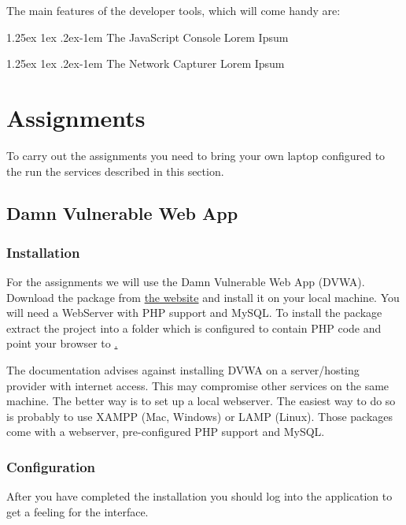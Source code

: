 \documentclass{report}
\makeatletter
\renewcommand{\paragraph}{
  \@startsection{paragraph}{4}
    {\z@}{1.25ex \@plus 1ex \@minus .2ex}{-1em}
      {\normalfont\normalsize\bfseries}
      }
\makeatother
\begin{document}
The main features of the developer tools, which will come handy are: 

\paragraph{The JavaScript Console}
Lorem Ipsum

\paragraph{The Network Capturer}
Lorem Ipsum


\section{Assignments}

To carry out the assignments you need to bring your own laptop configured
to the run the services described in this section.

\subsection{Damn Vulnerable Web App}
\subsubsection{Installation}
For the assignments we will use the Damn Vulnerable Web App (\textsc{DVWA}).
Download the package from \href{http://www.dvwa.co.uk/}{the website} and 
install it on your local machine. You will need a WebServer with PHP support 
and MySQL. To install the package extract the project into a folder which
is configured to contain PHP code and point your browser to 
\href{http://localhost/dvwa/index.php}.

The documentation advises against installing \textsc{DVWA} on a server/hosting 
provider with internet access. This may compromise other services on the same 
machine.
The better way is to set up a local webserver. The easiest way to do so
is probably to use XAMPP (Mac, Windows) or LAMP (Linux). Those packages
come with a webserver, pre-configured PHP support and MySQL.

\subsubsection{Configuration}
After you have completed the installation you should log into the
application to get a feeling for the interface.
\end{document}
